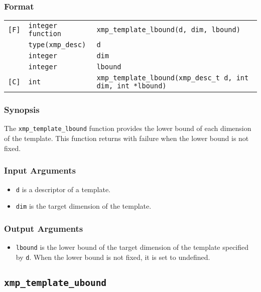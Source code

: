 \subsubsection*{Format}

\begin{tabular}{lll}

\verb![F]!& {\tt integer function}& {\tt xmp\_template\_lbound(d, dim, lbound)}\\
          & {\tt type(xmp\_desc)} & {\tt d}\\
          & {\tt integer} & {\tt dim}\\
          & {\tt integer} & {\tt lbound}\\

\verb![C]!&  {\tt int}& {\tt xmp\_template\_lbound(xmp\_desc\_t d, int dim, int *lbound)}\\

\end{tabular}

\subsubsection*{Synopsis}

The {\tt xmp\_template\_lbound} function provides the lower bound of each
dimension of the template. This function returns with failure when the
lower bound is not fixed.

\subsubsection*{Input Arguments}
\begin{itemize}
 \item {\tt d} is a descriptor of a template.
 \item {\tt dim} is the target dimension of the template.
\end{itemize}

\subsubsection*{Output Arguments}
\begin{itemize}
 \item {\tt lbound} is the lower bound of the target dimension of the
       template specified by {\tt d}.  When the lower bound is not
       fixed, it is set to undefined.
\end{itemize}


\subsection{\tt xmp\_template\_ubound}

